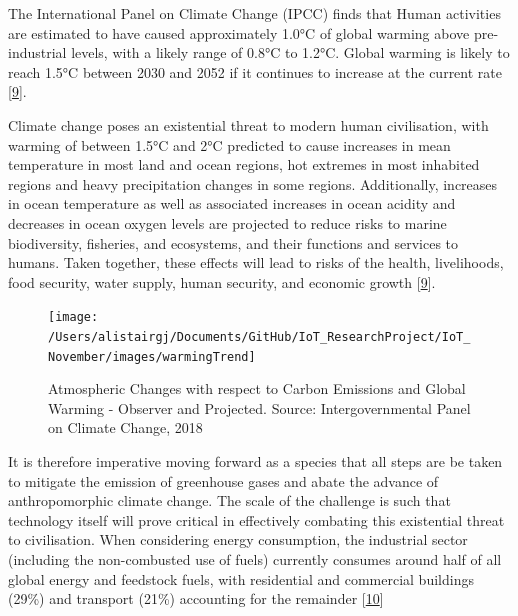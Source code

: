 \documentclass[11pt,]{article}
\begin{document}
The International Panel on Climate Change (IPCC) finds that Human
activities are estimated to have caused approximately 1.0°C of global
warming above pre-industrial levels, with a likely range of 0.8°C to
1.2°C. Global warming is likely to reach 1.5°C between 2030 and 2052 if
it continues to increase at the current rate
{[}\protect\hyperlink{ref-intergovernmentalpanelonclimatechangeGlobalWarming2018}{9}{]}.

Climate change poses an existential threat to modern human civilisation,
with warming of between 1.5°C and 2°C predicted to cause increases in
mean temperature in most land and ocean regions, hot extremes in most
inhabited regions and heavy precipitation changes in some regions.
Additionally, increases in ocean temperature as well as associated
increases in ocean acidity and decreases in ocean oxygen levels are
projected to reduce risks to marine biodiversity, fisheries, and
ecosystems, and their functions and services to humans. Taken together,
these effects will lead to risks of the health, livelihoods, food
security, water supply, human security, and economic growth
{[}\protect\hyperlink{ref-intergovernmentalpanelonclimatechangeGlobalWarming2018}{9}{]}.

\begin{figure}[H]

{\centering \texttt{[image: /Users/alistairgj/Documents/GitHub/IoT\_ResearchProject/IoT\_November/images/warmingTrend]} 

}

\caption{Atmospheric Changes with respect to Carbon Emissions and Global Warming - Observer and Projected. Source: Intergovernmental Panel on Climate Change, 2018}\label{fig:warmingTrend}
\end{figure}

It is therefore imperative moving forward as a species that all steps
are be taken to mitigate the emission of greenhouse gases and abate the
advance of anthropomorphic climate change. The scale of the challenge is
such that technology itself will prove critical in effectively combating
this existential threat to civilisation. When considering energy
consumption, the industrial sector (including the non-combusted use of
fuels) currently consumes around half of all global energy and feedstock
fuels, with residential and commercial buildings (29\%) and transport
(21\%) accounting for the remainder
{[}\protect\hyperlink{ref-EnergyDemandSector}{10}{]}
\end{document}
